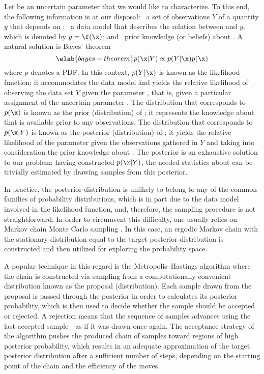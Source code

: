 Let \x be an uncertain parameter that we would like to characterize. To this
end, the following information is at our disposal: \one~a set of observations
$Y$ of a quantity $y$ that depends on \x; \two~a data model \f that describes
the relation between \x and $y$, which is denoted by $y = \f(\x)$; and
\three~prior knowledge (or beliefs) about \x. A natural solution is Bayes'
theorem \cite{gelman2013}
\begin{equation} \elab{bayes-theorem}
  p(\x | Y) \propto p(Y | \x) p(\x)
\end{equation}
where $p$ denotes a \ac{PDF}. In this context, $p(Y | \x)$ is known as the
likelihood function; it accommodates the data model \f and yields the relative
likelihood of observing the data set $Y$ given the parameter \x, that is, given
a particular assignment of the uncertain parameter \x. The distribution that
corresponds to $p(\x)$ is known as the prior (distribution) of \x; it represents
the knowledge about \x that is available prior to any observations. The
distribution that corresponds to $p(\x | Y)$ is known as the posterior
(distribution) of \x; it yields the relative likelihood of the parameter \x
given the observations gathered in $Y$ and taking into consideration the prior
knowledge about \x. The posterior is an exhaustive solution to our problem:
having constructed $p(\x | Y)$, the needed statistics about \x can be trivially
estimated by drawing samples from this posterior.

In practice, the posterior distribution is unlikely to belong to any of the
common families of probability distributions, which is in part due to the data
model involved in the likelihood function, and, therefore, the sampling
procedure is not straightforward. In order to circumvent this difficulty, one
usually relies on Markov chain Monte Carlo sampling \cite{gelman2013}. In this
case, an ergodic Markov chain with the stationary distribution equal to the
target posterior distribution is constructed and then utilized for exploring the
probability space.

A popular technique in this regard is the Metropolis--Hastings algorithm
\cite{gelman2013} where the chain is constructed via sampling from a
computationally convenient distribution known as the proposal (distribution).
Each sample drawn from the proposal is passed through the posterior in order to
calculates its posterior probability, which is then used to decide whether the
sample should be accepted or rejected. A rejection means that the sequence of
samples advances using the last accepted sample---as if it was drawn once again.
The acceptance strategy of the algorithm pushes the produced chain of samples
toward regions of high posterior probability, which results in an adequate
approximation of the target posterior distribution after a sufficient number of
steps, depending on the starting point of the chain and the efficiency of the
moves.
